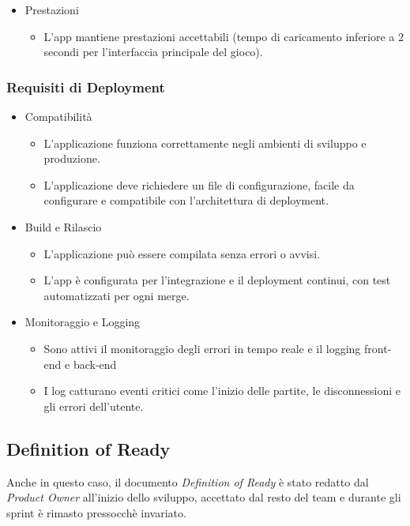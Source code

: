 \documentclass{article}
\begin{document}
\begin{itemize}
    \item Prestazioni
    \begin{itemize}
        \item L'app mantiene prestazioni accettabili (tempo di caricamento inferiore a 2 secondi per l'interfaccia principale del gioco).
    \end{itemize}
\end{itemize}

\subsubsection{Requisiti di Deployment}
\begin{itemize}
    \item Compatibilità
    \begin{itemize}
        \item L'applicazione funziona correttamente negli ambienti di sviluppo e produzione.
        \item L'applicazione deve richiedere un file di configurazione, facile da configurare e compatibile con l'architettura di deployment.
    \end{itemize}

    \item Build e Rilascio
    \begin{itemize}
        \item L'applicazione può essere compilata senza errori o avvisi.
        \item L'app è configurata per l'integrazione e il deployment continui, con test automatizzati per ogni merge.
    \end{itemize}

    \item Monitoraggio e Logging
    \begin{itemize}
        \item Sono attivi il monitoraggio degli errori in tempo reale e il logging front-end e back-end
        \item I log catturano eventi critici come l'inizio delle partite, le disconnessioni e gli errori dell'utente.
    \end{itemize}
\end{itemize}

\subsection{Definition of Ready}
Anche in questo caso, il documento \textit{Definition of Ready} è stato redatto dal \textit{Product Owner} all'inizio
dello sviluppo, accettato dal resto del team e durante gli sprint è rimasto pressocchè invariato.
\end{document}
